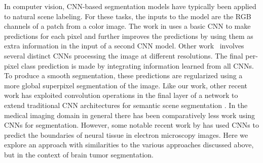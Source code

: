 \documentclass[final,5p,times,twocolumn]{elsarticle}
\newcommand{\PMJ}[1]{\textcolor{green}{\small{}[\textbf{Pierre-Marc:} #1]}}
\begin{document}
In computer vision, CNN-based segmentation models have typically been applied to natural scene labeling.
For these tasks, the inputs to the model are the RGB channels of a patch from a color image. The work in \citet{pinheiro2014} uses a basic CNN to make predictions for each pixel and further improves the predictions by using them as extra information in the input of a second CNN model. %
Other work~\citep{farabet2013} involves several distinct CNNs processing the image at different resolutions. %
The final per-pixel class prediction is made by integrating information learned from all CNNs. To produce a smooth segmentation, these predictions are regularized using a more global superpixel segmentation of the image. Like our work, other recent work has exploited convolution operations in the final layer of a network to extend traditional CNN architectures for semantic scene segmentation \citep{long_shelhamer_fcn}. 
%
In the medical imaging domain in general there has been comparatively less work using CNNs for segmentation. However, some notable recent work by \citet{DeepAndWide2013} has used CNNs to predict the boundaries of neural tissue in electron microscopy images. Here we explore an approach with similarities to the various approaches discussed above, but %
in the context of brain tumor segmentation.

\end{document}
